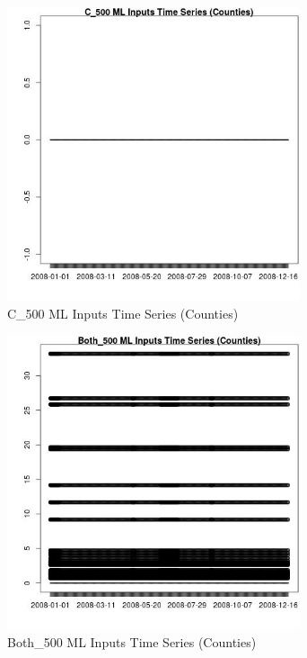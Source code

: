 \begin{figure} 
\centering  
\includegraphics[width=0.77\textwidth]{Code_Outputs/ML_input_report_ML_input_CountyGeometricCentroids_Locations_Dates_part_c_2008-01-01to2008-12-31_C_500TS.jpg} 
\caption{\label{fig:ML_input_report_ML_input_CountyGeometricCentroids_Locations_Dates_part_c_2008-01-01to2008-12-31C_500TS}C_500 ML Inputs Time Series (Counties)} 
\end{figure} 
 

\begin{figure} 
\centering  
\includegraphics[width=0.77\textwidth]{Code_Outputs/ML_input_report_ML_input_CountyGeometricCentroids_Locations_Dates_part_c_2008-01-01to2008-12-31_Both_500TS.jpg} 
\caption{\label{fig:ML_input_report_ML_input_CountyGeometricCentroids_Locations_Dates_part_c_2008-01-01to2008-12-31Both_500TS}Both_500 ML Inputs Time Series (Counties)} 
\end{figure} 
 

